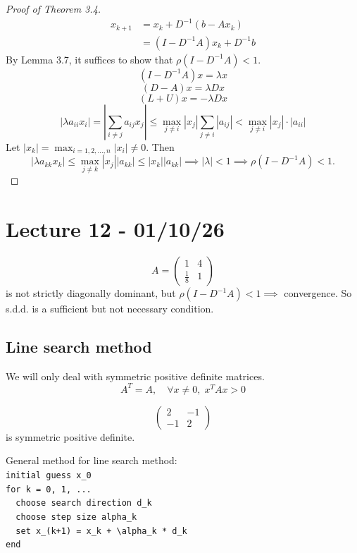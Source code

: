 \documentclass[11pt]{article}
\begin{document}
\begin{proof}[Proof of Theorem 3.4]
    \begin{align*}
        x_{k+1} &= x_k + D^{-1}(b-Ax_k)\\
        &= (I-D^{-1}A)x_k + D^{-1}b
    \end{align*}
    By Lemma 3.7, it suffices to show that $\rho(I-D^{-1}A) < 1$.
    \[
        (I-D^{-1}A)x = \lambda x
    \]
    \[
        (D-A)x=\lambda Dx
    \]
    \[
        (L+U)x = -\lambda Dx
    \]
   \[
    |\lambda a_{ii}x_i| = |\sum_{i \ne j}a_{ij}x_j| \le \max_{j \ne i}|x_j| \sum_{j \ne i}|a_{ij}| < \max_{j \ne i}|x_j|\cdot|a_{ii} | 
   \]
    Let $|x_k| = \max_{i = 1, 2, \dots, n}|x_i| \ne 0$. Then
    \[
        |\lambda a_{kk}x_k| \le \max_{j \ne k} |x_j||a_{kk}| \le |x_k||a_{kk}| \implies |\lambda| < 1 \implies \rho(I-D^{-1}A) < 1.
    \]
    
\end{proof}

\section{Lecture 12 - 01/10/26}
\begin{remark}
    \[
        A = \begin{pmatrix}
            1 & 4 \\
            \frac{1}{8} & 1
        \end{pmatrix}
    \]
    is not strictly diagonally dominant, but $\rho (I - D^{-1}A) < 1 \implies $ convergence. So s.d.d. is a sufficient but not necessary condition. 
\end{remark}

\subsection{Line search method}
We will only deal with symmetric positive definite matrices.
\[
    A^T = A, \quad  \forall x \ne 0, \; x^T A x > 0
\]
\begin{example}
    \[
        \begin{pmatrix}
            2 & -1 \\
            -1 & 2
        \end{pmatrix}
    \]
    is symmetric positive definite.
\end{example}
General method for line search method:\\
\verb|initial guess x_0|\\
\verb|for k = 0, 1, ...|\\
\verb|  choose search direction d_k|\\
\verb|  choose step size alpha_k|\\
\verb|  set x_(k+1) = x_k + \alpha_k * d_k|\\
\verb|end|
\end{document}
